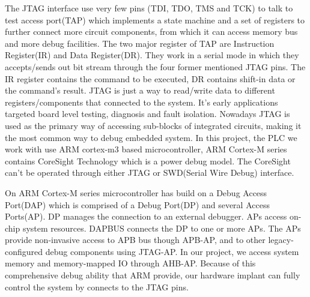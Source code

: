 The JTAG interface use very few pins (TDI, TDO, TMS and TCK) to talk to test access port(TAP) which implements a state machine and a set of registers to further connect more circuit components, from which it can access memory bus and more debug facilities. The two major register of TAP are Instruction Register(IR) and Data Register(DR). They work in a serial mode in which they accepts/sends out bit stream through the four former mentioned JTAG pins. The IR register contains the command to be executed, DR contains shift-in data or the command's result. JTAG is just a way to read/write data to different registers/components that connected to the system. It's early applications targeted board level testing, diagnosis and fault isolation. Nowadays JTAG is used as the primary way of accessing sub-blocks of integrated circuits, making it the most common way to debug embedded system. In this project, the PLC we work with use ARM cortex-m3 based microcontroller, ARM Cortex-M series  contains CoreSight Technology which is a power debug model. The CoreSight can't be operated through either JTAG or SWD(Serial Wire Debug) interface.

On ARM Cortex-M series microcontroller has build on a Debug Access Port(DAP) which is comprised of a Debug Port(DP) and several Access Ports(AP). DP manages the connection to an external debugger. APs access on-chip system resources. DAPBUS connects the DP to one or more APs. The APs provide non-invasive access to APB bus though APB-AP,  and to other legacy-configured debug components using JTAG-AP. In our project, we access system memory and memory-mapped IO through AHB-AP. Because of this comprehensive debug ability that ARM provide, our hardware implant can fully control the system by connects to the JTAG pins.

